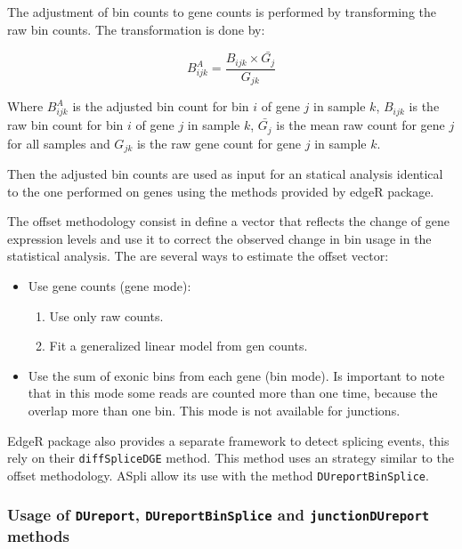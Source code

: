 \documentclass{article}
\begin{document}
The adjustment of bin counts to gene counts is performed by transforming the
raw bin counts. The transformation is done by:

\begin{equation}
  B^{A}_{ijk} = \frac{ B_{ijk} \times \bar{G_{j}} } { G_{jk} }
\end{equation}

Where $B^{A}_{ijk}$ is the adjusted bin count for bin $i$ of gene $j$ in sample
$k$, $B_{ijk}$ is the raw bin count for bin $i$ of gene $j$ in sample $k$, 
$\bar{G_{j}}$ is the mean raw count for gene $j$ for all samples and $G_{jk}$ is
the raw gene count for gene $j$ in sample $k$.

Then the adjusted bin counts are used as input for an statical analysis
identical to the one performed on genes using the methods provided by edgeR
package.

The offset methodology consist in define a vector that reflects the change of
gene expression levels and use it to correct the observed change in bin usage
in the statistical analysis.
The are several ways to estimate the offset vector:

\begin{itemize}
  \item Use gene counts (gene mode):
  \begin{enumerate}
     \item Use only raw counts.
     \item Fit a generalized linear model from gen counts.	
  \end{enumerate}
  \item Use the sum of exonic bins from each gene (bin mode). Is important to
  note that in this mode some reads are counted more than one time, because the
  overlap more than one bin. This mode is not available for junctions.
\end{itemize}

EdgeR package also provides a separate framework to detect splicing events, this
rely on their \texttt{diffSpliceDGE} method. This method uses an strategy
similar to the offset methodology. ASpli allow its use with the method
\texttt{DUreportBinSplice}.


\subsubsection{ Usage of \texttt{DUreport}, \texttt{DUreportBinSplice} and
\texttt{junctionDUreport} methods }
\end{document}
